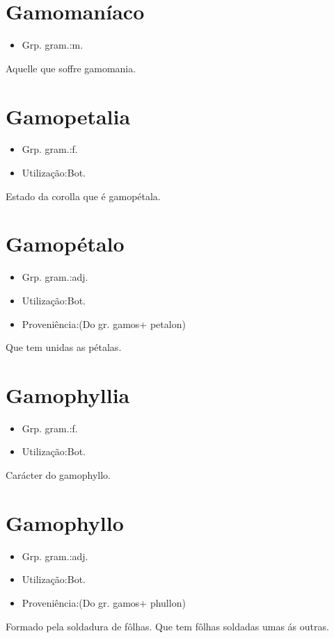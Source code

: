 \section{Gamomaníaco}
\begin{itemize}
\item {Grp. gram.:m.}
\end{itemize}
Aquelle que soffre gamomania.
\section{Gamopetalia}
\begin{itemize}
\item {Grp. gram.:f.}
\end{itemize}
\begin{itemize}
\item {Utilização:Bot.}
\end{itemize}
Estado da corolla que é gamopétala.
\section{Gamopétalo}
\begin{itemize}
\item {Grp. gram.:adj.}
\end{itemize}
\begin{itemize}
\item {Utilização:Bot.}
\end{itemize}
\begin{itemize}
\item {Proveniência:(Do gr. \textunderscore gamos\textunderscore  + \textunderscore petalon\textunderscore )}
\end{itemize}
Que tem unidas as pétalas.
\section{Gamophyllia}
\begin{itemize}
\item {Grp. gram.:f.}
\end{itemize}
\begin{itemize}
\item {Utilização:Bot.}
\end{itemize}
Carácter do gamophyllo.
\section{Gamophyllo}
\begin{itemize}
\item {Grp. gram.:adj.}
\end{itemize}
\begin{itemize}
\item {Utilização:Bot.}
\end{itemize}
\begin{itemize}
\item {Proveniência:(Do gr. \textunderscore gamos\textunderscore  + \textunderscore phullon\textunderscore )}
\end{itemize}
Formado pela soldadura de fôlhas.
Que tem fôlhas soldadas umas ás outras.
